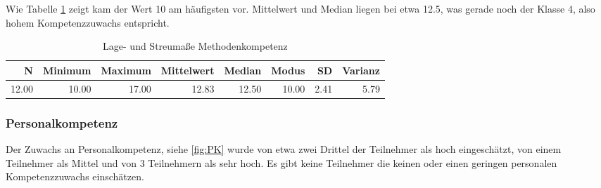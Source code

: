 \documentclass[12pt, bibliography=totoc]{scrartcl}
\begin{document}
Wie Tabelle \ref{tab:lMK} zeigt kam der Wert 10 am häufigsten vor.
Mittelwert und Median liegen bei etwa 12.5, was gerade noch der Klasse
4, also hohem Kompetenzzuwachs entspricht.

\begin{table}[H]
\centering
\caption{Lage- und Streumaße Methodenkompetenz}
\label{tab:lMK}
\begin{tabular}{rrrrrrrr}
  \hline
  N & Minimum & Maximum & Mittelwert & Median & Modus & SD & Varianz \\
  \hline
  12.00 & 10.00 & 17.00 & 12.83 & 12.50 & 10.00 & 2.41 & 5.79 \\
   \hline
\end{tabular}
\end{table}

\subsubsection{Personalkompetenz}\label{personalkompetenz}

Der Zuwachs an Personalkompetenz, siehe \ref{fig:PK} wurde von etwa zwei
Drittel der Teilnehmer als hoch eingeschätzt, von einem Teilnehmer als
Mittel und von 3 Teilnehmern als sehr hoch. Es gibt keine Teilnehmer die
keinen oder einen geringen personalen Kompetenzzuwachs einschätzen.
\end{document}
